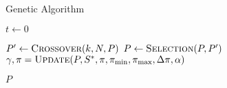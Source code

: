 \begin{algorithm}
  \caption{Genetic Algorithm}\label{alg:GENETIKUS_ALGORITMUS}
  \begin{algorithmic}[1]
    \State $t \leftarrow 0$
    \State {}

    \State $P' \leftarrow \Call{Crossover}{k, N, P}$
    \State {}
    \State $P \leftarrow \Call{Selection}{P, P'}$
    \State $\gamma, \pi = \Call{Update}{P, S^{*}, \pi, \pi_{\min}, \pi_{\max}, \Delta \pi, \alpha}$
    \EndWhile

    \State \Return $P$
    \EndFunction
  \end{algorithmic}
\end{algorithm}
